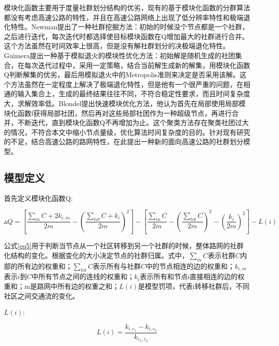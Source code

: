 				模块化函数主要用于度量社群划分结构的优劣，现有的基于模块化函数的分群算法都没有考虑高速公路的特性\parencite{WeightPretreatment}，并且在高速公路网络上出现了低分辨率特性和极端退化特性\parencite{Ren2014The}。Newman提出了一种社群挖掘方法\parencite{NewmanFast}：初始的时候没个节点都是一个社群，之后进行迭代，每次迭代时都选择使目标模块函数在Q增加最大的社群进行合并。这个方法虽然在时间效率上很高，但是没有解社群划分的决极端退化特性。Guimera提出一种基于模拟退火的模块性优化方法：初始解是随机生成的社团集合，在每次迭代过程中，采用一定策略，结合当前解生成新的解集，用模块化函数Q判断解集的优劣，最后用模拟退火中的Metropolis准则来决定是否采用该解。这个方法虽然在一定程度上解决了极端退化特性，但是他有一个很严重的问题，在相通的输入集合上，生成的最终结果往往不同，不符合稳定性要求，而且时间复杂度大，求解效率低。Blondel\parencite{TuihuoEfficency}提出快速模块优化方法，他认为首先在局部使用局部模块化函数f获得局部社团，然后再对这些局部社团作为一种超级节点，再进行合并，不断迭代，直到模块化函数Q不再增加为止。这个聚类方法存在聚类社团过大的情况，不符合本文中缩小节点量级，优化算法时间复杂度的目的。针对现有研究的不足，结合高速公路的路网特性，在此提出一种新的面向高速公路的社群划分模型。
		\subsection{模型定义}

				首先定义模块化函数Q:

				\begin{equation}
				\vartriangle Q = [\frac{{\sum_{in} C  + 2{k_{i,in}}}}{{2m}} - {(\frac{{\sum_{tot} C  + {k_i}}}{{2m}})^2}] - [\frac{{\sum_{in} C }}{{2m}} - {(\frac{{\sum_{tot} C }}{{2m}})^2} - {(\frac{{{k_i}}}{{2m}})^2}] - L(i)
				\label{eq5}
				\end{equation}

				公式\ref{eq5}用于判断当节点从一个社区转移到另一个社群的时候，整体路网的社群化结构的变化。根据变化的大小决定节点的社群归属。式中，$\sum_{in} C$表示社群$C$内部的所有边的权重和；$\sum_{tot} C$表示所有与社群$C$中的节点相连的边的权重和；$k_{i,in}$表示$i$到$C$中所有节点之间的连线的权重和；$k_i$表示所有和节点i直接相连的边的权重和；m是路网中所有边的权重之和；$L(i)$是模型罚项，代表i转移社群后，不同社区之间交通流的变化。

				$L(i)$:

				\begin{equation}
				L(i)=\frac{{{k_{i,{c_1}}} - {k_{i,{c_2}}}}}{{{k_{{c_1},{c_2}}}}}
				\label{eq6}
				\end{equation}

